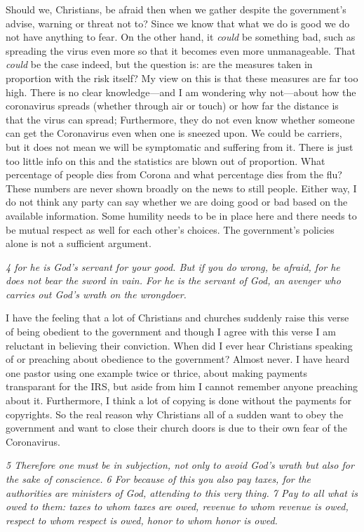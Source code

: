 Should we, Christians, be afraid then when we gather despite the
government's advise, warning or threat not to? Since we know that what
we do is good we do not have anything to fear. On the other hand, it
\emph{could} be something bad, such as spreading the virus even more so
that it becomes even more unmanageable. That \emph{could} be the case
indeed, but the question is: are the measures taken in proportion with
the risk itself? My view on this is that these measures are far too
high. There is no clear knowledge---and I am wondering why not---about
how the coronavirus spreads (whether through air or touch) or how far
the distance is that the virus can spread; Furthermore, they do not even
know whether someone can get the Coronavirus even when one is sneezed
upon. We could be carriers, but it does not mean we will be symptomatic
and suffering from it. There is just too little info on this and the
statistics are blown out of proportion. What percentage of people dies
from Corona and what percentage dies from the flu? These numbers are
never shown broadly on the news to still people. Either way, I do not
think any party can say whether we are doing good or bad based on the
available information. Some humility needs to be in place here and there
needs to be mutual respect as well for each other's choices. The
government's policies alone is not a sufficient argument.

\emph{4 for he is God's servant for your good. But if you do wrong, be
afraid, for he does not bear the sword in vain. For he is the servant of
God, an avenger who carries out God's wrath on the wrongdoer.}

I have the feeling that a lot of Christians and churches suddenly raise
this verse of being obedient to the government and though I agree with
this verse I am reluctant in believing their conviction. When did I ever
hear Christians speaking of or preaching about obedience to the
government? Almost never. I have heard one pastor using one example
twice or thrice, about making payments transparant for the IRS, but
aside from him I cannot remember anyone preaching about it. Furthermore,
I think a lot of copying is done without the payments for copyrights. So
the real reason why Christians all of a sudden want to obey the
government and want to close their church doors is due to their own fear
of the Coronavirus.

\emph{5 Therefore one must be in subjection, not only to avoid God's
wrath but also for the sake of conscience. 6 For because of this you
also pay taxes, for the authorities are ministers of God, attending to
this very thing. 7 Pay to all what is owed to them: taxes to whom taxes
are owed, revenue to whom revenue is owed, respect to whom respect is
owed, honor to whom honor is owed.}

